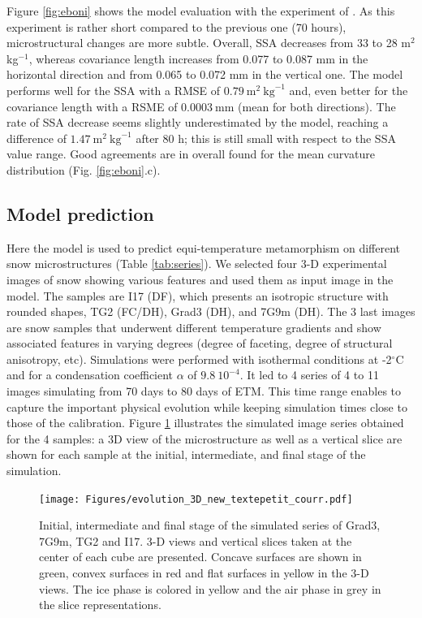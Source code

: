 \documentclass[draft,ms]{agujournal2019}
\begin{document}
Figure \ref{fig:eboni} shows the model evaluation with the experiment of . As this experiment is rather short compared to the previous one (70 hours), microstructural changes are more subtle. Overall, SSA decreases from 33 to 28 m$^2$ kg$^{-1}$, whereas covariance length increases from 0.077 to 0.087 mm in the horizontal direction and from 0.065 to 0.072 mm in the vertical one. The model performs well for the SSA with a RMSE of $0.79\ \mathrm{m}^2\ \mathrm{kg}^{-1}$ and, even better for the covariance length with a RSME of $0.0003\ \mathrm{mm}$ (mean for both directions).
The rate of SSA decrease seems slightly underestimated by the model, reaching a difference of $1.47\ \mathrm{m}^2\ \mathrm{kg}^{-1}$ after 80 h; this is still small with respect to the SSA value range. Good agreements are in overall found for the mean curvature distribution (Fig. \ref{fig:eboni}.c). \\


\subsection{Model prediction}
\label{sec:prediction}

Here the model is used to predict equi-temperature metamorphism on different snow microstructures (Table \ref{tab:series}). We selected four 3-D experimental images of snow showing various features and used them as input image in the model. The samples are I17 (DF), which presents an isotropic structure with rounded shapes, TG2 (FC/DH), Grad3 (DH), and 7G9m (DH). The 3 last images are snow samples that underwent different temperature gradients and show associated features in varying degrees (degree of faceting, degree of structural anisotropy, etc). Simulations were performed with isothermal conditions at -2$^\circ$C and for a condensation coefficient $\alpha$ of $9.8\ 10^{-4}$. It led to 4 series of 4 to 11 images simulating from 70 days to 80 days of ETM. This time range enables to capture the important physical evolution while keeping simulation times close to those of the calibration. Figure \ref{fig:evolutions_3D} illustrates the simulated image series obtained for the 4 samples: a 3D view of the microstructure as well as a vertical slice are shown for each sample at the initial, intermediate, and final stage of the simulation.\\

\begin{figure}
    \centering
    \texttt{[image: Figures/evolution\_3D\_new\_textepetit\_courr.pdf]}
    \caption{Initial, intermediate and final stage of the simulated series of Grad3, 7G9m, TG2 and I17. 3-D views and vertical slices taken at the center of each cube are presented. Concave surfaces are shown in green, convex surfaces in red and flat surfaces in yellow in the 3-D views. The ice phase is colored in yellow and the air phase in grey in the slice representations.}
    \label{fig:evolutions_3D}
\end{figure}
\end{document}

